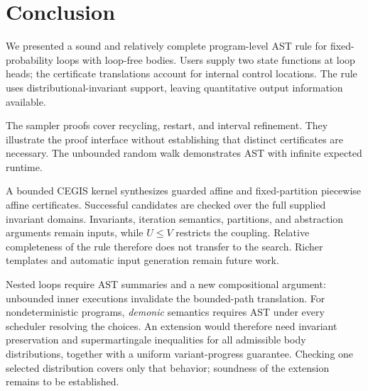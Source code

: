 \section{Conclusion}
\label{sec:conclusion}

We presented a sound and relatively complete program-level AST rule for
fixed-probability loops with loop-free bodies. Users supply two state
functions at loop heads; the certificate translations account for internal
control locations. The rule uses distributional-invariant support, leaving
quantitative output information available.

The sampler proofs cover recycling, restart, and interval refinement.
They illustrate the proof interface without establishing that distinct
certificates are necessary. The unbounded random walk demonstrates AST
with infinite expected runtime.

A bounded CEGIS kernel synthesizes guarded affine and fixed-partition
piecewise affine certificates. Successful candidates are checked over
the full supplied invariant domains. Invariants, iteration semantics,
partitions, and abstraction arguments remain inputs, while $U\leq V$
restricts the coupling. Relative completeness of the rule therefore does
not transfer to the search. Richer templates and automatic input generation
remain future work.

Nested loops require AST summaries and a new compositional argument:
unbounded inner executions invalidate the bounded-path translation.
For nondeterministic programs, \emph{demonic} semantics requires AST
under every scheduler resolving the choices. An extension would therefore
need invariant preservation and supermartingale inequalities for all
admissible body distributions, together with a uniform variant-progress
guarantee. Checking one selected distribution covers only that behavior;
soundness of the extension remains to be established.
